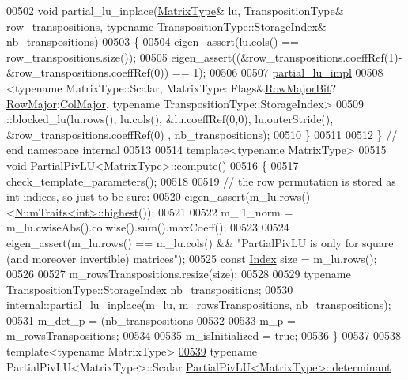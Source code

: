 \begin{DoxyCode}
00502 \textcolor{keywordtype}{void} partial\_lu\_inplace(\hyperlink{group___core___module_class_eigen_1_1_block}{MatrixType}& lu, TranspositionType& row\_transpositions, \textcolor{keyword}{typename} 
      TranspositionType::StorageIndex& nb\_transpositions)
00503 \{
00504   eigen\_assert(lu.cols() == row\_transpositions.size());
00505   eigen\_assert((&row\_transpositions.coeffRef(1)-&row\_transpositions.coeffRef(0)) == 1);
00506 
00507   \hyperlink{struct_eigen_1_1internal_1_1partial__lu__impl}{partial\_lu\_impl}
00508     <\textcolor{keyword}{typename} MatrixType::Scalar, MatrixType::Flags&\hyperlink{group__flags_gae4f56c2a60bbe4bd2e44c5b19cbe8762}{RowMajorBit}?
      \hyperlink{group__enums_ggaacded1a18ae58b0f554751f6cdf9eb13acfcde9cd8677c5f7caf6bd603666aae3}{RowMajor}:\hyperlink{group__enums_ggaacded1a18ae58b0f554751f6cdf9eb13a0cbd4bdd0abcfc0224c5fcb5e4f6669a}{ColMajor}, \textcolor{keyword}{typename} TranspositionType::StorageIndex>
00509     ::blocked\_lu(lu.rows(), lu.cols(), &lu.coeffRef(0,0), lu.outerStride(), &row\_transpositions.coeffRef(0)
      , nb\_transpositions);
00510 \}
00511 
00512 \} \textcolor{comment}{// end namespace internal}
00513 
00514 \textcolor{keyword}{template}<\textcolor{keyword}{typename} MatrixType>
00515 \textcolor{keywordtype}{void} \hyperlink{group___l_u___module_class_eigen_1_1_partial_piv_l_u}{PartialPivLU<MatrixType>::compute}()
00516 \{
00517   check\_template\_parameters();
00518 
00519   \textcolor{comment}{// the row permutation is stored as int indices, so just to be sure:}
00520   eigen\_assert(m\_lu.rows()<\hyperlink{group___core___module_struct_eigen_1_1_num_traits}{NumTraits<int>::highest}());
00521 
00522   m\_l1\_norm = m\_lu.cwiseAbs().colwise().sum().maxCoeff();
00523 
00524   eigen\_assert(m\_lu.rows() == m\_lu.cols() && \textcolor{stringliteral}{"PartialPivLU is only for square (and moreover invertible)
       matrices"});
00525   \textcolor{keyword}{const} \hyperlink{namespace_eigen_a62e77e0933482dafde8fe197d9a2cfde}{Index} size = m\_lu.rows();
00526 
00527   m\_rowsTranspositions.resize(size);
00528 
00529   \textcolor{keyword}{typename} TranspositionType::StorageIndex nb\_transpositions;
00530   internal::partial\_lu\_inplace(m\_lu, m\_rowsTranspositions, nb\_transpositions);
00531   m\_det\_p = (nb\_transpositions%
00532 
00533   m\_p = m\_rowsTranspositions;
00534 
00535   m\_isInitialized = \textcolor{keyword}{true};
00536 \}
00537 
00538 \textcolor{keyword}{template}<\textcolor{keyword}{typename} MatrixType>
\hyperlink{group___l_u___module_a54c3d39c9b46ff485a8d2140b9b23193}{00539} \textcolor{keyword}{typename} PartialPivLU<MatrixType>::Scalar \hyperlink{group___l_u___module_class_eigen_1_1_partial_piv_l_u}{PartialPivLU<MatrixType>::determinant}

\end{DoxyCode}
